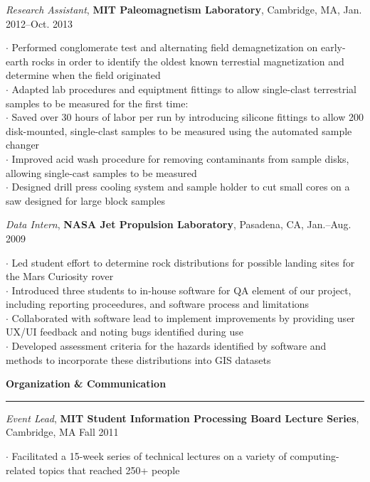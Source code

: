\documentclass[11pt]{article}
\begin{document}
\smallskip
\emph {Research Assistant}, \textbf {MIT Paleomagnetism Laboratory}, Cambridge, MA, Jan. 2012--Oct. 2013 \\ 
\begin{small}$\cdot$ {Performed conglomerate test and alternating field demagnetization on early-earth rocks in order to identify the oldest known terrestial magnetization and determine when the field originated} \\
$\cdot$ {Adapted lab procedures and equiptment fittings to allow single-clast terrestrial samples to be measured for the first time:} \\
$\cdot$ {Saved over 30 hours of labor per run by introducing silicone fittings to allow 200 disk-mounted, single-clast samples to be measured using the automated sample changer}\\
$\cdot$ {Improved acid wash procedure for removing contaminants from sample disks, allowing single-cast samples to be measured} \\
$\cdot$ {Designed drill press cooling system and sample holder to cut small cores on a saw designed for large block samples}\end{small}

\smallskip
\emph{Data Intern}, \textbf{NASA Jet Propulsion Laboratory}, Pasadena, CA, Jan.--Aug. 2009 \\
\begin{small}$\cdot$ {Led student effort to determine rock distributions for possible landing sites for the Mars Curiosity rover }\\
$\cdot$ {Introduced three students to in-house software for QA element of our project, including reporting proceedures, and software process and limitations }\\
$\cdot$ {Collaborated with software lead to implement improvements by providing user UX/UI feedback and noting bugs identified during use }\\
$\cdot$ {Developed assessment criteria for the hazards identified by software and methods to incorporate these distributions into GIS datasets }\end{small}

\vspace*{0.25 mm}
\textbf{Organization \& Communication}
\smallskip
\hrule
\emph{Event Lead}, \textbf{MIT Student Information Processing Board Lecture Series}, Cambridge, MA Fall 2011\\
\begin{small}$\cdot$ {Facilitated a 15-week series of technical lectures on a variety of computing-related topics that reached 250+ people}\end{small}
\end{document}
